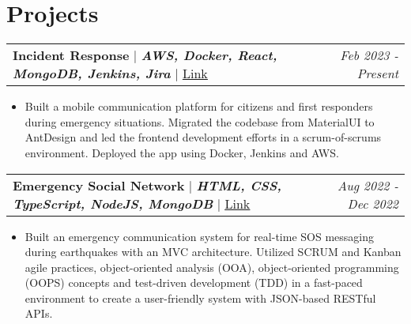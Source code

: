 \documentclass[letterpaper]{article}
\makeatletter
\newcommand{\resumeItemWithoutTitle}[1]{
  \item{
    {#1 \vspace{-4pt}}
  }
}
\newcommand{\shortSection}[1]{
    \vspace{-6pt}
    \section{#1}
}
\newcommand{\projectHeading}[4]{
  \begin{tabular*}{\textwidth}{l@{\extracolsep{\fill}}r}
        \textbf{#1} 
        \hspace{-2pt} $\vert$ \hspace{-2pt} {\textit{\textbf{#2}}} 
        \hspace{-2pt} $\vert$ \hspace{-2pt} \href{#3}{ \underline{Link}}
        & 
        \textit{#4} \\
    \end{tabular*}\vspace{-2pt}
}
\newcommand{\resumeItemListStart}{\begin{itemize}}
\newcommand{\resumeItemListEnd}{\end{itemize}}
\makeatother
\begin{document}

\shortSection{Projects}
\vspace{3pt}
\projectHeading{Incident Response}{AWS, Docker, React, MongoDB, Jenkins, Jira}{https://sa.sem-ir.com/}{Feb 2023 - Present}
\resumeItemListStart
\resumeItemWithoutTitle{Built a mobile communication platform for citizens and first responders during emergency situations. Migrated the codebase from MaterialUI to AntDesign and led the frontend development efforts in a scrum-of-scrums environment. Deployed the app using Docker, Jenkins and AWS.}
\resumeItemListEnd


\vspace{3pt}
\projectHeading {Emergency Social Network}{HTML, CSS, TypeScript, NodeJS, MongoDB}{https://esn.onrender.com}{Aug 2022 - Dec 2022}
\resumeItemListStart
\resumeItemWithoutTitle{Built an emergency communication system for real-time SOS messaging during earthquakes with an MVC architecture. Utilized SCRUM and Kanban agile practices, object-oriented analysis (OOA), object-oriented programming (OOPS) concepts and test-driven development (TDD) in a fast-paced environment to create a user-friendly system with JSON-based RESTful APIs.}
\resumeItemListEnd




\end{document}

